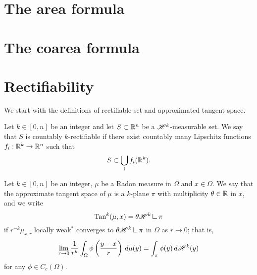 \section{The area formula}


\section{The coarea formula}


\section{Rectifiability}

We start with the definitions of rectifiable set and approximated tangent space.

\begin{definition}
Let $k \in [0, n]$ be an integer and let $S \subset \mathbb{R}^{n}$ be a $\mathscr{H}^{k}$-measurable set. We say that $S$ is countably $k$-rectifiable if there exist countably many Lipschitz functions $f_{i} : \mathbb{R}^{k} \to \mathbb{R}^{n}$ such that 
\begin{equation*}
S \subset \bigcup_{i} f_{i}(\mathbb{R}^{k}).
\end{equation*}
\end{definition}

\begin{definition}
Let $k \in [0, n]$ be an integer, $\mu$ be a Radon measure in $\Omega$ and $x \in \Omega$. We say that the approximate tangent space of $\mu$ is a $k$-plane $\pi$ with multiplicity $\theta \in \mathbb{R}$ in $x$, and we write 
\begin{equation*}
\Tan^{k}(\mu, x) = \theta \Haus{k} \res \pi
\end{equation*}
if $r^{-k} \mu_{x, r}$ locally weak$^*$ converges to $\theta \Haus{k} \res \pi$ in $\Omega$ as $r \to 0$; that is, 
\begin{equation*}
\lim_{r \to 0} \frac{1}{r^{k}} \int_{\Omega} \phi\left (\frac{y - x}{r}\right) \, d \mu(y) = \int_{\pi} \phi(y) \, d \mathscr{H}^{k}(y)
\end{equation*}
for any $\phi \in C_{c}(\Omega)$.
\end{definition}